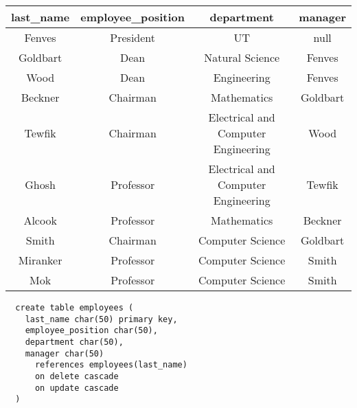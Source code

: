 \documentclass[12pt, letterpaper, fleqn]{article}
\begin{document}
\begin{center}
\begin{tabular} { c | c | c | c }
  last\_name & employee\_position & department & manager\\
  \hline
  Fenves                                            &	President
  &	UT                                              & null  \\
Goldbart                                          &	Dean
&	Natural Science                                   &	Fenves
\\
Wood                                              &	Dean
&	Engineering                                       &	Fenves
\\
Beckner                                           &	Chairman
&	Mathematics                                       &	Goldbart
\\
Tewfik                                            &	Chairman
&	Electrical and Computer Engineering               &	Wood
\\
Ghosh                                             &	Professor
&	Electrical and Computer Engineering               &	Tewfik
\\
Alcook                                            &	Professor
&	Mathematics                                       &	Beckner
\\
Smith                                             &	Chairman
&	Computer Science                                  &	Goldbart
\\
Miranker                                          &	Professor
&	Computer Science                                  &	Smith
\\
Mok                                               &	Professor
&	Computer Science                                  &	Smith
\\
\end{tabular}
\end{center}

\begin{verbatim}
  create table employees (
    last_name char(50) primary key,
    employee_position char(50),
    department char(50),
    manager char(50)
      references employees(last_name)
      on delete cascade
      on update cascade
  )
\end{verbatim}
\end{document}
